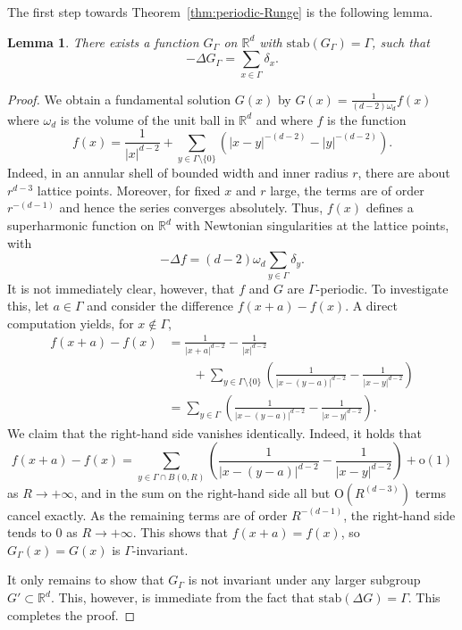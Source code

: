 \documentclass[12pt]{paper}
\numberwithin{equation}{section}
\theoremstyle{plain}
\newtheorem{lemma}[theorem]{Lemma}
\theoremstyle{definition}
\newcommand{\Rd}{\mathbb{R}^{d}}
\begin{document}
The first step towards Theorem~\ref{thm:periodic-Runge} is the following lemma.
\begin{lemma}
  \label{lem:periodic-fundamental-sol}
  There exists a function \(G_\Gamma\) on \(\Rd\) with \(\mathrm{stab}(G_\Gamma)=\Gamma\),
  such that
  \[
    -\Delta G_\Gamma=\sum_{x\in\Gamma}\delta_x.
  \]
\end{lemma}

\begin{proof}
  We obtain a fundamental solution \(G(x)\) by \(G(x)=\frac{1}{(d-2)\omega_d}f(x)\) where
  \(\omega_d\) is the volume of the unit ball in \(\Rd\) and where \(f\) is the function
  \[
    f(x)=\frac{1}{|x|^{d-2}}+ \sum_{y\in
      \Gamma\setminus\{0\}}\left(|x-y|^{-(d-2)}-|y|^{-(d-2)}\right).
  \]
  Indeed, in an annular shell of bounded width and inner radius \(r\), there are about \(r^{d-3}\)
  lattice points. Moreover, for fixed \(x\) and \(r\) large, the terms are of order \(r^{-(d-1)}\)
  and hence the series converges absolutely. Thus, \(f(x)\) defines a superharmonic function on
  \(\Rd\) with Newtonian singularities at the lattice points, with
  \[
    -\Delta f=(d-2)\omega_d\sum_{y\in \Gamma}\delta_{y}.
  \]
  It is not immediately clear, however, that \(f\) and \(G\) are \(\Gamma\)-periodic.  To
  investigate this, let \(a\in \Gamma\) and consider the difference \(f(x+a)-f(x)\). A direct
  computation yields, for \(x\notin \Gamma\),
  \begin{align*}
    f(x+a)-f(x)&=\frac{1}{|x+a|^{d-2}}-\frac{1}{|x|^{d-2}} \\
               &\qquad +\sum_{y\in \Gamma\setminus\{0\}}
                 \left(\frac{1}{|x-(y-a)|^{d-2}}-\frac{1}{|x-y|^{d-2}}\right)\\
               &=\sum_{y\in\Gamma}\left(\frac{1}{|x-(y-a)|^{d-2}}-\frac{1}{|x-y|^{d-2}}\right).
  \end{align*}
  We claim that the right-hand side vanishes identically. Indeed, it holds that
  \[
    f(x+a)-f(x)=\sum_{y\in\Gamma\cap B(0,R)}
    \left(\frac{1}{|x-(y-a)|^{d-2}}-\frac{1}{|x-y|^{d-2}}\right)+\mathrm{o}(1)
  \]
  as \(R\to+\infty\), and in the sum on the right-hand side all but \(\mathrm{O}(R^{(d-3)})\) terms
  cancel exactly.  As the remaining terms are of order \(R^{-(d-1)}\), the right-hand side tends to
  \(0\) as \(R\to+\infty\). This shows that \(f(x+a)=f(x)\), so \(G_\Gamma(x) = G(x)\) is
  \(\Gamma\)-invariant.

  It only remains to show that \(G_\Gamma\) is not invariant under any larger subgroup
  \(G'\subset\Rd\). This, however, is immediate from the fact that
  \(\mathrm{stab}(\Delta G)=\Gamma\). This completes the proof.
\end{proof}
\end{document}
